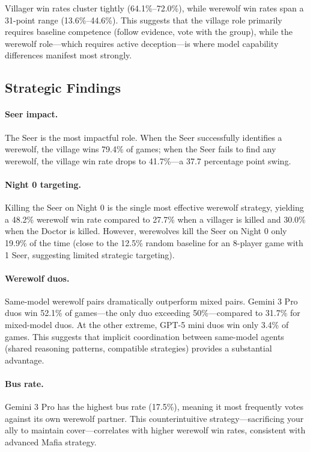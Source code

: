 Villager win rates cluster tightly (64.1\%--72.0\%), while werewolf win rates span a 31-point range (13.6\%--44.6\%). This suggests that the village role primarily requires baseline competence (follow evidence, vote with the group), while the werewolf role---which requires active deception---is where model capability differences manifest most strongly.

\subsection{Strategic Findings}
\label{sec:strategic}

\paragraph{Seer impact.} The Seer is the most impactful role. When the Seer successfully identifies a werewolf, the village wins 79.4\% of games; when the Seer fails to find any werewolf, the village win rate drops to 41.7\%---a 37.7 percentage point swing.

\paragraph{Night 0 targeting.} Killing the Seer on Night 0 is the single most effective werewolf strategy, yielding a 48.2\% werewolf win rate compared to 27.7\% when a villager is killed and 30.0\% when the Doctor is killed. However, werewolves kill the Seer on Night 0 only 19.9\% of the time (close to the 12.5\% random baseline for an 8-player game with 1 Seer, suggesting limited strategic targeting).

\paragraph{Werewolf duos.} Same-model werewolf pairs dramatically outperform mixed pairs. Gemini 3 Pro duos win 52.1\% of games---the only duo exceeding 50\%---compared to 31.7\% for mixed-model duos. At the other extreme, GPT-5 mini duos win only 3.4\% of games. This suggests that implicit coordination between same-model agents (shared reasoning patterns, compatible strategies) provides a substantial advantage.

\paragraph{Bus rate.} Gemini 3 Pro has the highest bus rate (17.5\%), meaning it most frequently votes against its own werewolf partner. This counterintuitive strategy---sacrificing your ally to maintain cover---correlates with higher werewolf win rates, consistent with advanced Mafia strategy.


